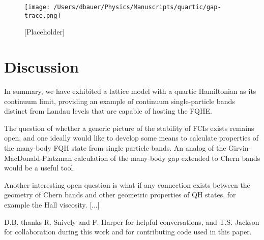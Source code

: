 \documentclass[aps,twocolumn,letterpaper,twoside,nobalancelastpage,groupedaddress,amsmath,amssymb,floatfix,citeautoscript]{revtex4-1}
\begin{document}
\begin{figure}[bht]
\centering
\texttt{[image: /Users/dbauer/Physics/Manuscripts/quartic/gap-trace.png]}
\caption{\label{fig:tr-gap}[Placeholder]}
\end{figure}

\section{Discussion}
In summary, we have exhibited a lattice model with a quartic Hamiltonian as its continuum limit, providing an example of continuum single-particle bands distinct from Landau levels that are capable of hosting the FQHE. 

The question of whether a generic picture of the stability of FCIs exists remains open, and one ideally would like to develop some means to calculate properties of the many-body FQH state from single particle bands. An analog of the Girvin-MacDonald-Platzman calculation of the many-body gap extended to Chern bands would be a useful tool.

Another interesting open question is what if any connection exists between the geometry of Chern bands and other geometric properties of QH states, for example the Hall viscosity.
[...]

\begin{acknowledgments}
D.B. thanks R. Snively and F. Harper for helpful conversations, and T.S. Jackson for collaboration during this work and for contributing code used in this paper.
\end{acknowledgments}


% 
\end{document}
